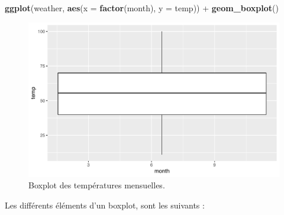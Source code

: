 \documentclass[
  a4paper,
]{article}
\newenvironment{Shaded}{\begin{snugshade}}{\end{snugshade}}
\newcommand{\DataTypeTok}[1]{\textcolor[rgb]{0.00,0.34,0.68}{#1}}
\newcommand{\KeywordTok}[1]{\textcolor[rgb]{0.12,0.11,0.11}{\textbf{#1}}}
\newcommand{\NormalTok}[1]{\textcolor[rgb]{0.12,0.11,0.11}{#1}}
\newcommand{\OperatorTok}[1]{\textcolor[rgb]{0.12,0.11,0.11}{#1}}
\newcommand{\StringTok}[1]{\textcolor[rgb]{0.75,0.01,0.01}{#1}}
\begin{document}
\begin{Shaded}
\begin{Highlighting}[]
\KeywordTok{ggplot}\NormalTok{(weather, }\KeywordTok{aes}\NormalTok{(}\DataTypeTok{x =} \KeywordTok{factor}\NormalTok{(month), }\DataTypeTok{y =}\NormalTok{ temp)) }\OperatorTok{+}
\StringTok{  }\KeywordTok{geom_boxplot}\NormalTok{()}
\end{Highlighting}
\end{Shaded}

\begin{figure}[htpb]

{\centering \includegraphics[width=0.9\linewidth]{figure/unnamed-chunk-54-1} 

}

\caption{Boxplot des températures mensuelles.}\label{fig:unnamed-chunk-54}
\end{figure}

Les différents éléments d'un boxplot, sont les suivants :
\end{document}
